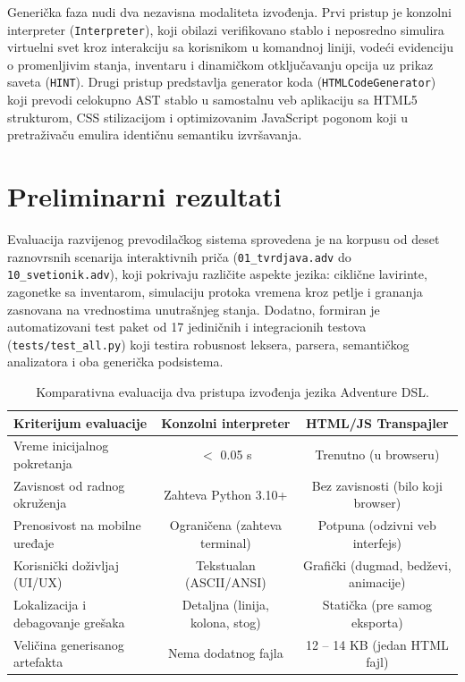 \documentclass[12pt,a4paper]{article}
\begin{document}
Generička faza nudi dva nezavisna modaliteta izvođenja. Prvi pristup je konzolni interpreter (\texttt{Interpreter}), koji obilazi verifikovano stablo i neposredno simulira virtuelni svet kroz interakciju sa korisnikom u komandnoj liniji, vodeći evidenciju o promenljivim stanja, inventaru i dinamičkom otključavanju opcija uz prikaz saveta (\texttt{HINT}). Drugi pristup predstavlja generator koda (\texttt{HTMLCodeGenerator}) koji prevodi celokupno AST stablo u samostalnu veb aplikaciju sa HTML5 strukturom, CSS stilizacijom i optimizovanim JavaScript pogonom koji u pretraživaču emulira identičnu semantiku izvršavanja.

\section{Preliminarni rezultati}
Evaluacija razvijenog prevodilačkog sistema sprovedena je na korpusu od deset raznovrsnih scenarija interaktivnih priča (\texttt{01\_tvrdjava.adv} do \texttt{10\_svetionik.adv}), koji pokrivaju različite aspekte jezika: ciklične lavirinte, zagonetke sa inventarom, simulaciju protoka vremena kroz petlje i grananja zasnovana na vrednostima unutrašnjeg stanja. Dodatno, formiran je automatizovani test paket od 17 jediničnih i integracionih testova (\texttt{tests/test\_all.py}) koji testira robusnost leksera, parsera, semantičkog analizatora i oba generička podsistema.

\begin{table}[H]
  \centering
  \caption{Komparativna evaluacija dva pristupa izvođenja jezika Adventure DSL.}
  \label{tab:evaluacija}
  \renewcommand{\arraystretch}{1.3}
  \begin{tabular}{|p{}|c|c|}
    \hline
    \textbf{Kriterijum evaluacije} & \textbf{Konzolni interpreter} & \textbf{HTML/JS Transpajler} \\ \hline
    Vreme inicijalnog pokretanja & $<$ 0.05 s & Trenutno (u browseru) \\ \hline
    Zavisnost od radnog okruženja & Zahteva Python 3.10+ & Bez zavisnosti (bilo koji browser) \\ \hline
    Prenosivost na mobilne uređaje & Ograničena (zahteva terminal) & Potpuna (odzivni veb interfejs) \\ \hline
    Korisnički doživljaj (UI/UX) & Tekstualan (ASCII/ANSI) & Grafički (dugmad, bedževi, animacije) \\ \hline
    Lokalizacija i debagovanje grešaka & Detaljna (linija, kolona, stog) & Statička (pre samog eksporta) \\ \hline
    Veličina generisanog artefakta & Nema dodatnog fajla & 12 -- 14 KB (jedan HTML fajl) \\ \hline
  \end{tabular}
\end{table}
\end{document}

